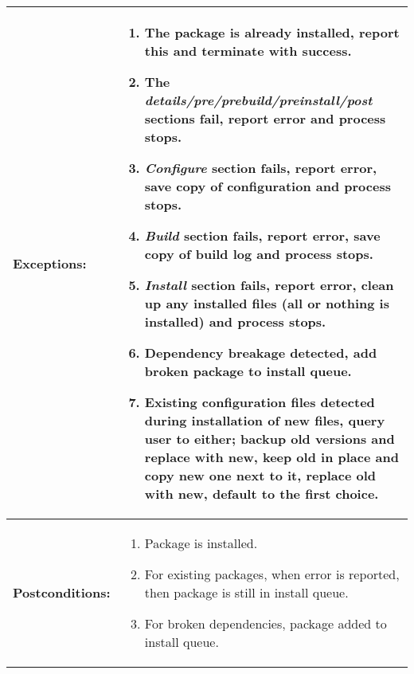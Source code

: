 \newpage
\begin{tabularx}{\linewidth}{|l|X|}
\hline
\textbf{Exceptions:} & 
\begin{minipage}{\linewidth} 
  \vspace{0.05em}
  \begin{enumerate}
    \item The package is already installed, report this and terminate with success.
    \item The \emph{details/pre/prebuild/preinstall/post} sections fail, report error and process stops.
    \item \emph{Configure} section fails, report error, save copy of configuration and process stops.
    \item \emph{Build} section fails, report error, save copy of build log and process stops.
    \item \emph{Install} section fails, report error, clean up any installed files (all or nothing is installed) and process stops.
    \item Dependency breakage detected, add broken package to install queue.
    \item Existing configuration files detected during installation of new files, query user to either; backup old versions and replace with new, keep old in place and copy new one next to it, replace old with new, default to the first choice.
  \end{enumerate}
  \vspace{0.05em}
\end{minipage}
\\
\hline 
\textbf{Postconditions:} &
\begin{minipage}{\linewidth}
  \vspace{0.05em}
  \begin{enumerate}
    \item Package is installed.
    \item For existing packages, when error is reported, then package is still in install queue.
    \item For broken dependencies, package added to install queue.
  \end{enumerate}
  \vspace{0.05em}
\end{minipage}
\\
\hline
\end{tabularx}


